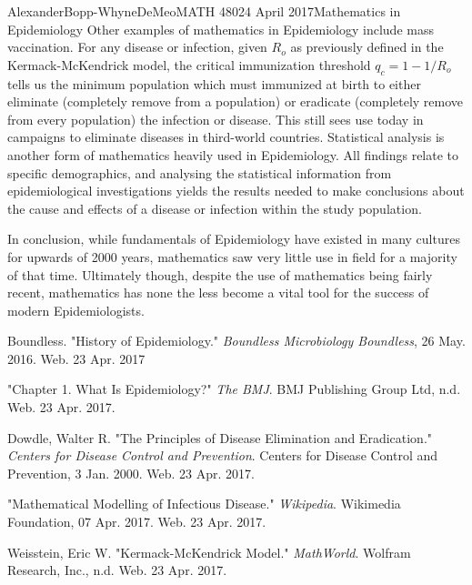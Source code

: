 \documentclass[12pt, letterpaper]{article}
\begin{document}
\begin{mla}{Alexander}{Bopp-Whyne}{DeMeo}{MATH 480}{24 April 2017}{Mathematics in Epidemiology}
Other examples of mathematics in Epidemiology include mass vaccination. For any disease or infection, given \(R_o\) as previously defined in the Kermack-McKendrick model, the critical immunization threshold  \(q_c = 1 - 1/R_o\) tells us the minimum population which must immunized at birth to either eliminate (completely remove from a population) or eradicate (completely remove from every population) the infection or disease. This still sees use today in campaigns to eliminate diseases in third-world countries. Statistical analysis is another form of mathematics heavily used in Epidemiology. All findings relate to specific demographics, and analysing the statistical information from epidemiological investigations yields the results needed to make conclusions about the cause and effects of a disease or infection within the study population. 

In conclusion, while fundamentals of Epidemiology have existed in many cultures for upwards of 2000 years, mathematics saw very little use in field for a majority of that time. Ultimately though, despite the use of mathematics being fairly recent, mathematics has none the less become a vital tool for the success of modern Epidemiologists. 

\begin{workscited}

\bibent Boundless. "History of Epidemiology." \textit{Boundless Microbiology Boundless}, 26 May. 2016. Web. 23 Apr. 2017 

\bibent "Chapter 1. What Is Epidemiology?" \textit{The BMJ}. BMJ Publishing Group Ltd, n.d. Web. 23 Apr. 2017.

\bibent Dowdle, Walter R. "The Principles of Disease Elimination and Eradication." \textit{Centers for Disease Control and Prevention}. Centers for Disease Control and Prevention, 3 Jan. 2000. Web. 23 Apr. 2017.

\bibent "Mathematical Modelling of Infectious Disease." \textit{Wikipedia}. Wikimedia Foundation, 07 Apr. 2017. Web. 23 Apr. 2017.

\bibent Weisstein, Eric W. "Kermack-McKendrick Model." \textit{MathWorld}. Wolfram Research, Inc., n.d. Web. 23 Apr. 2017.

\end{workscited}
\end{mla}
\end{document}
